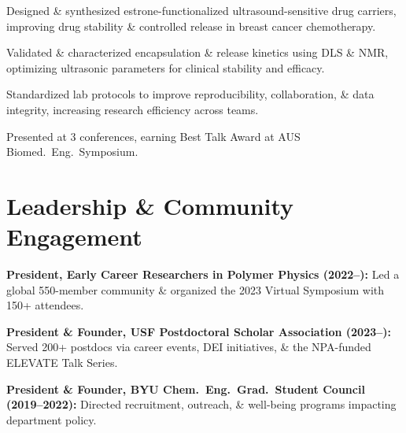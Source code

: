 \documentclass[letterpaper,12pt]{article}
\begin{document}
\begin{tabitemize}
  \item Designed \& synthesized estrone-functionalized ultrasound-sensitive drug carriers, improving drug stability \& controlled release in breast cancer chemotherapy.
  \item Validated \& characterized encapsulation \& release kinetics using DLS \& NMR, optimizing ultrasonic parameters for clinical stability and efficacy.
  \item Standardized lab protocols to improve reproducibility, collaboration, \& data integrity, increasing research efficiency across teams.
  \item Presented at 3 conferences, earning Best Talk Award at AUS Biomed.~Eng.~Symposium.%
\end{tabitemize}

\section*{Leadership \& Community Engagement}
\begin{tabitemize}
  \item \textbf{President, Early Career Researchers in Polymer Physics (2022–):} Led a global 550-member community \& organized the 2023 Virtual Symposium with 150+ attendees.
  \item \textbf{President \& Founder, USF Postdoctoral Scholar Association (2023–):} Served 200+ postdocs via career events, DEI initiatives, \& the NPA-funded ELEVATE Talk Series.
  \item \textbf{President \& Founder, BYU Chem.~Eng.~Grad.~Student Council (2019–2022):} Directed recruitment, outreach, \& well-being programs impacting department policy.
\end{tabitemize}
\end{document}
